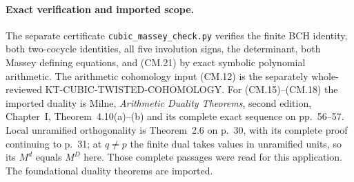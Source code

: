 \paragraph{Exact verification and imported scope.}
The separate certificate
\texttt{cubic\_massey\_check.py} verifies the finite BCH
identity, both two-cocycle identities, all five involution
signs, the determinant, both Massey defining equations,
and (CM.21) by exact symbolic polynomial arithmetic.
The arithmetic cohomology input (CM.12) is the separately
whole-reviewed KT-CUBIC-TWISTED-COHOMOLOGY.
For (CM.15)--(CM.18) the imported duality is Milne,
\emph{Arithmetic Duality Theorems}, second edition,
Chapter~I, Theorem~4.10(a)--(b) and its complete exact
sequence on pp.~56--57.  Local unramified orthogonality
is Theorem~2.6 on p.~30, with its complete proof continuing
to p.~31; at $q\ne p$ the finite dual takes values in
unramified units, so its $M^d$ equals $M^D$ here.
Those complete passages were read for this application.
The foundational duality theorems are imported.
